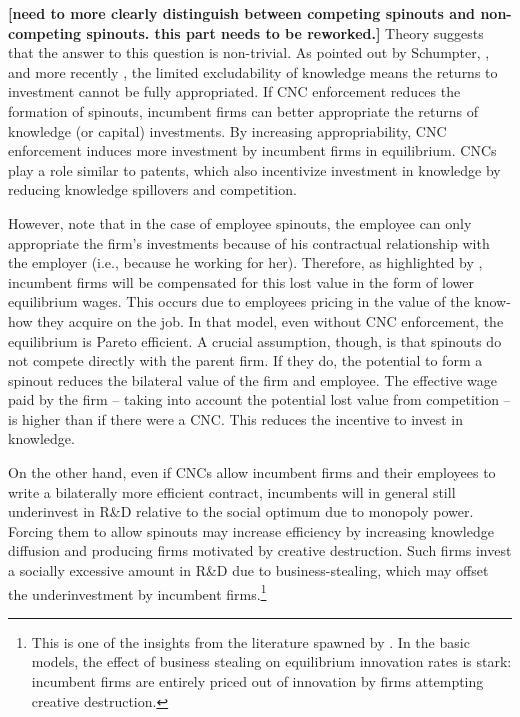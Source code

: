 \documentclass[11pt,english]{article}
\theoremstyle{remark}
\begin{document}
\textbf{[need to more clearly distinguish between competing spinouts and non-competing spinouts. this part needs to be reworked.]}
Theory suggests that the answer to this question is non-trivial. As pointed out by Schumpter, \cite{arrow_economic_1962}, and more recently \cite{romer_increasing_1986}, the limited excludability of knowledge means the returns to investment cannot be fully appropriated. If CNC enforcement reduces the formation of spinouts, incumbent firms can better appropriate the returns of knowledge (or capital) investments. By increasing appropriability, CNC enforcement induces more investment by incumbent firms in equilibrium. CNCs play a role similar to patents, which also incentivize investment in knowledge by reducing knowledge spillovers and competition.

However, note that in the case of employee spinouts, the employee can only appropriate the firm's investments because of his contractual relationship with the employer  (i.e., because he working for her).  Therefore, as highlighted by \cite{franco_spin-outs:_2006}, incumbent firms will be compensated for this lost value in the form of lower equilibrium wages. This occurs due to employees pricing in the value of the know-how they acquire on the job. In that model, even without CNC enforcement, the equilibrium is Pareto efficient. A crucial assumption, though, is that spinouts do not compete directly with the parent firm. If they do, the potential to form a spinout reduces the bilateral value of the firm and employee. The effective wage paid by the firm -- taking into account the potential lost value from competition -- is higher than if there were a CNC. This reduces the incentive to invest in knowledge. 

On the other hand, even if CNCs allow incumbent firms and their employees to write a bilaterally more efficient contract, incumbents will in general still underinvest in R\&D relative to the social optimum due to monopoly power. Forcing them to allow spinouts may increase efficiency by increasing knowledge diffusion and producing firms motivated by creative destruction. Such firms invest a socially excessive amount in R\&D due to business-stealing, which may offset the underinvestment by incumbent firms.\footnote{This is one of the insights from the literature spawned by \cite{grossman_quality_1991}. In the basic models, the effect of business stealing on equilibrium innovation rates is stark: incumbent firms are entirely priced out of innovation by firms attempting creative destruction.}
\end{document}

